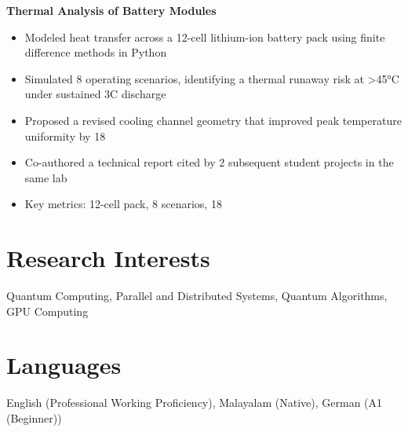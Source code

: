 \documentclass[11pt,a4paper]{article}
\begin{document}
\textbf{ Thermal Analysis of Battery Modules }
\begin{itemize}[leftmargin=*,nosep,topsep=2pt]
    
    \item Modeled heat transfer across a 12-cell lithium-ion battery pack using finite difference methods in Python
    
    \item Simulated 8 operating scenarios, identifying a thermal runaway risk at >45°C under sustained 3C discharge
    
    \item Proposed a revised cooling channel geometry that improved peak temperature uniformity by 18%
    
    \item Co-authored a technical report cited by 2 subsequent student projects in the same lab
    
    \item Key metrics: 12-cell pack, 8 scenarios, 18%
    
\end{itemize}


\section{Research Interests}
Quantum Computing, Parallel and Distributed Systems, Quantum Algorithms, GPU Computing

\section{Languages}
English (Professional Working Proficiency), Malayalam (Native), German (A1 (Beginner))
\end{document}
